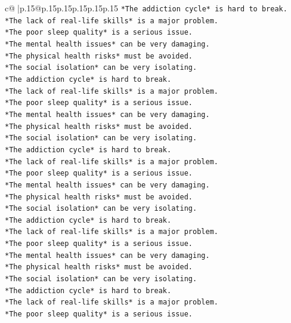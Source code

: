 \documentclass{article}
\begin{document}
{\begin{supertabular}{c@{$\;$}|p{.15\linewidth}@{}p{.15\linewidth}p{.15\linewidth}p{.15\linewidth}p{.15\linewidth}p{.15\linewidth}}
{{{\texttt{*The addiction cycle* is hard to break.} \\
\texttt{*The lack of real{-}life skills* is a major problem.} \\
\texttt{*The poor sleep quality* is a serious issue.} \\
\texttt{*The mental health issues* can be very damaging.} \\
\texttt{*The physical health risks* must be avoided.} \\
\texttt{*The social isolation* can be very isolating.} \\
\texttt{*The addiction cycle* is hard to break.} \\
\texttt{*The lack of real{-}life skills* is a major problem.} \\
\texttt{*The poor sleep quality* is a serious issue.} \\
\texttt{*The mental health issues* can be very damaging.} \\
\texttt{*The physical health risks* must be avoided.} \\
\texttt{*The social isolation* can be very isolating.} \\
\texttt{*The addiction cycle* is hard to break.} \\
\texttt{*The lack of real{-}life skills* is a major problem.} \\
\texttt{*The poor sleep quality* is a serious issue.} \\
\texttt{*The mental health issues* can be very damaging.} \\
\texttt{*The physical health risks* must be avoided.} \\
\texttt{*The social isolation* can be very isolating.} \\
\texttt{*The addiction cycle* is hard to break.} \\
\texttt{*The lack of real{-}life skills* is a major problem.} \\
\texttt{*The poor sleep quality* is a serious issue.} \\
\texttt{*The mental health issues* can be very damaging.} \\
\texttt{*The physical health risks* must be avoided.} \\
\texttt{*The social isolation* can be very isolating.} \\
\texttt{*The addiction cycle* is hard to break.} \\
\texttt{*The lack of real{-}life skills* is a major problem.} \\
\texttt{*The poor sleep quality* is a serious issue.} \\
}}}
\end{supertabular}}
\end{document}
